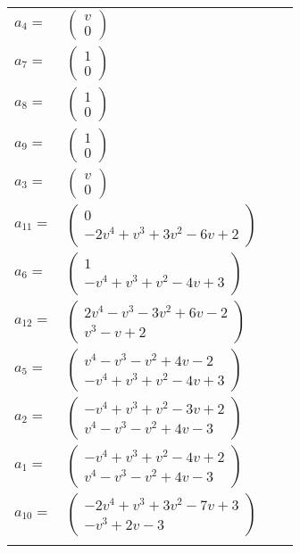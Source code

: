 \documentclass[1p]{elsarticle_modified}
\theoremstyle{definition}
\begin{document}
\begin{tabular}{m{7pt} m{180pt} m{7pt} m{180pt} }
\flushright $a_{4}=$&$\begin{pmatrix}v\\0\end{pmatrix}$ \\
\flushright $a_{7}=$&$\begin{pmatrix}1\\0\end{pmatrix}$ \\
\flushright $a_{8}=$&$\begin{pmatrix}1\\0\end{pmatrix}$ \\
\flushright $a_{9}=$&$\begin{pmatrix}1\\0\end{pmatrix}$ \\
\flushright $a_{3}=$&$\begin{pmatrix}v\\0\end{pmatrix}$ \\
\flushright $a_{11}=$&$\begin{pmatrix}0\\-2 v^4+v^3+3 v^2-6 v+2\end{pmatrix}$ \\
\flushright $a_{6}=$&$\begin{pmatrix}1\\- v^4+v^3+v^2-4 v+3\end{pmatrix}$ \\
\flushright $a_{12}=$&$\begin{pmatrix}2 v^4- v^3-3 v^2+6 v-2\\v^3- v+2\end{pmatrix}$ \\
\flushright $a_{5}=$&$\begin{pmatrix}v^4- v^3- v^2+4 v-2\\- v^4+v^3+v^2-4 v+3\end{pmatrix}$ \\
\flushright $a_{2}=$&$\begin{pmatrix}- v^4+v^3+v^2-3 v+2\\v^4- v^3- v^2+4 v-3\end{pmatrix}$ \\
\flushright $a_{1}=$&$\begin{pmatrix}- v^4+v^3+v^2-4 v+2\\v^4- v^3- v^2+4 v-3\end{pmatrix}$ \\
\flushright $a_{10}=$&$\begin{pmatrix}-2 v^4+v^3+3 v^2-7 v+3\\- v^3+2 v-3\end{pmatrix}$\\&\end{tabular}
\end{document}
